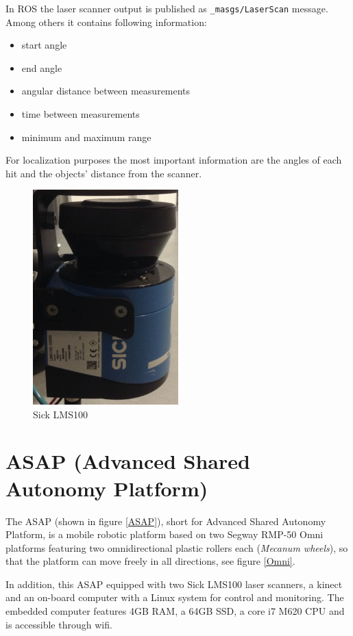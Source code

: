 In ROS the laser scanner output is published as \texttt{\_masgs/LaserScan} message. Among others it contains following information:
\begin{itemize}
\item start angle
\item end angle
\item angular distance between measurements
\item time between measurements
\item minimum and maximum range
\end{itemize}

For localization purposes the most important information are the angles of each hit and the objects' distance from the scanner.

\begin{figure}[thpb]
      \centering
      \includegraphics[width=0.5\textwidth]{graphics/Laserscanner.png}
      \caption{Sick LMS100}
      \label{Laser}
   \end{figure}
\section{ASAP (Advanced Shared Autonomy Platform)}
The ASAP (shown in figure \ref{ASAP}), short for Advanced Shared Autonomy Platform, is a mobile robotic platform based on two Segway RMP-50 Omni platforms featuring two omnidirectional plastic rollers each (\textit{Mecanum wheels}), so that the platform can move freely in all directions, see figure \ref{Omni}.

In addition, this ASAP equipped with two Sick LMS100 laser scanners, a kinect and an on-board computer with a Linux system for control and monitoring. The embedded computer features 4GB RAM, a 64GB SSD, a core i7 M620 CPU and is accessible through wifi. 


